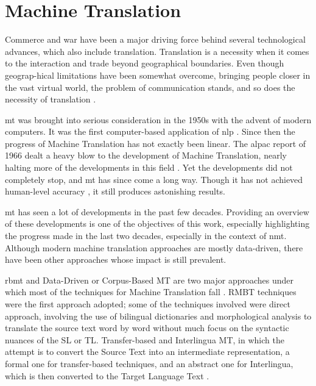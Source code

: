 \section{Machine Translation}

Commerce and war have been a major driving force behind several technological advances, which also include translation. Translation is a necessity when it comes to the interaction and trade beyond geographical boundaries. Even though geograp-hical limitations have been somewhat overcome, bringing people closer in the vast virtual world, the problem of communication stands, and so does the necessity of translation \cite{bhattacharyya2015machine}. 

\gls{mt} was brought into serious consideration in the 1950s with the advent of modern computers. It was the first computer-based application of \gls{nlp} \cite{hutchins1992introduction}. Since then the progress of Machine Translation has not exactly been linear. The \gls{alpac} report of 1966 dealt a heavy blow to the development of Machine Translation, nearly halting more of the developments in this field \cite{poibeau20171966}. Yet the developments did not completely stop, and \gls{mt} has since come a long way. Though it has not achieved human-level accuracy \cite{rivera2022machine}, it still produces astonishing results.

\gls{mt} has seen a lot of developments in the past few decades. Providing an overview of these developments is one of the objectives of this work, especially highlighting the progress made in the last two decades, especially in the context of \gls{nmt}. Although modern machine translation approaches are mostly data-driven, there have been other approaches whose impact is still prevalent.

\gls{rbmt} and Data-Driven or Corpus-Based MT are two major approaches under which most of the techniques for Machine Translation fall \cite{bhattacharyya2015machine}. RMBT techniques were the first approach adopted; some of the techniques involved were direct approach, involving the use of bilingual dictionaries and morphological analysis to translate the source text word by word without much focus on the syntactic nuances of the SL or TL.  Transfer-based and Interlingua MT, in which the attempt is to convert the Source Text into an intermediate representation, a formal one for transfer-based techniques, and an abstract one for Interlingua, which is then converted to the Target Language Text \cite{baker2019routledge}.

